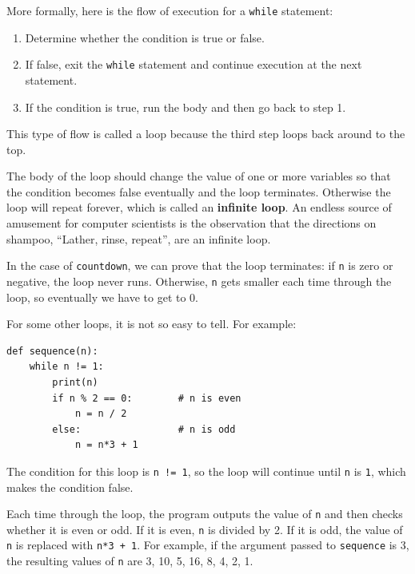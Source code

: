 \documentclass[10pt]{book}
\begin{document}
More formally, here is the flow of execution for a {\tt while} statement:

\begin{enumerate}

\item Determine whether the condition is true or false.

\item If false, exit the {\tt while} statement
and continue execution at the next statement.

\item If the condition is true, run the
body and then go back to step 1.

\end{enumerate}

This type of flow is called a loop because the third step
loops back around to the top.  

The body of the loop should change the value of one or more variables
so that the condition becomes false eventually and the loop
terminates.  Otherwise the loop will repeat forever, which is called
an {\bf infinite loop}.  An endless source of amusement for computer
scientists is the observation that the directions on shampoo,
``Lather, rinse, repeat'', are an infinite loop.

In the case of {\tt countdown}, we can prove that the loop
terminates: if {\tt n} is zero or negative, the loop never runs.
Otherwise, {\tt n} gets smaller each time through the
loop, so eventually we have to get to 0.

For some other loops, it is not so easy to tell.  For example:

\begin{verbatim}
def sequence(n):
    while n != 1:
        print(n)
        if n % 2 == 0:        # n is even
            n = n / 2
        else:                 # n is odd
            n = n*3 + 1
\end{verbatim}
%
The condition for this loop is {\tt n != 1}, so the loop will continue
until {\tt n} is {\tt 1}, which makes the condition false.

Each time through the loop, the program outputs the value of {\tt n}
and then checks whether it is even or odd.  If it is even, {\tt n} is
divided by 2.  If it is odd, the value of {\tt n} is replaced with
{\tt n*3 + 1}. For example, if the argument passed to {\tt sequence}
is 3, the resulting values of {\tt n} are 3, 10, 5, 16, 8, 4, 2, 1.
\end{document}
